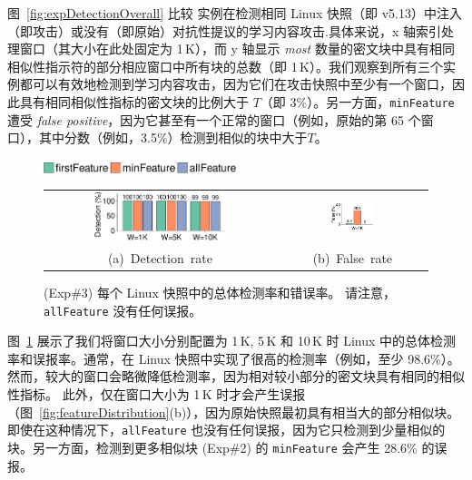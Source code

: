   图~\ref{fig:expDetectionOverall} 比较 \sysnameF 实例在检测相同 Linux 快照（即 v5.13）中注入（即攻击）或没有（即原始）对抗性提议的学习内容攻击.具体来说，x 轴索引处理窗口（其大小在此处固定为 1\,K），而 y 轴显示 {\em most} 数量的密文块中具有相同相似性指示符的部分相应窗口中所有块的总数（即 1\,K）。我们观察到所有三个实例都可以有效地检测到学习内容攻击，因为它们在攻击快照中至少有一个窗口，因此具有相同相似性指标的密文块的比例大于 $T $（即 3\%）。另一方面，{\tt minFeature} 遭受 {\em false positive}，因为它甚至有一个正常的窗口（例如，原始的第 65 个窗口），其中分数（例如，3.5\%）检测到相似的块中大于$T$。


\begin{figure}[t]
    \centering
    \includegraphics[width=0.5\textwidth]{pic/featurespy/plot/detection/overall/effectiveness-falsePositive_legend.pdf}
    \vspace{5pt}\\
    \begin{tabular}{@{\ }c@{\ }c}
        \includegraphics[width=0.6\textwidth]{pic/featurespy/plot/detection/overall/effectivenessLinux.pdf} &
        \includegraphics[width=0.3\textwidth]{pic/featurespy/plot/detection/overall/falsePositiveLinux.pdf}\\
        \mbox{\small (a) Detection rate} &
        \mbox{\small (b) False rate}\\
    \end{tabular}
    \vspace{-6pt}
    \caption{(Exp\#3) 每个 Linux 快照中的总体检测率和错误率。 请注意，{\tt allFeature} 没有任何误报。}
    \vspace{-6pt}
    \label{fig:expDetectionOverallFalsePositive}
\end{figure}

图~\ref{fig:expDetectionOverallFalsePositive} 展示了我们将窗口大小分别配置为 1\,K, 5\,K 和 10\,K 时 Linux 中的总体检测率和误报率。通常，\sysnameF 在 Linux 快照中实现了很高的检测率（例如，至少 98.6\%）。然而，较大的窗口会略微降低检测率，因为相对较小部分的密文块具有相同的相似性指标。
此外，\sysnameF 仅在窗口大小为 1\,K 时才会产生误报（图~\ref{fig:featureDistribution}(b)），因为原始快照最初具有相当大的部分相似块。即使在这种情况下，{\tt allFeature} 也没有任何误报，因为它只检测到少量相似的块。另一方面，检测到更多相似块 (Exp\#2) 的 {\tt minFeature} 会产生 28.6\% 的误报。


